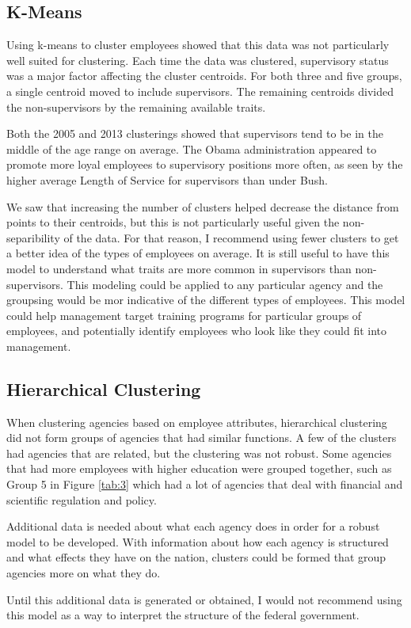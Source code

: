 \documentclass{article}
\begin{document}
    \subsection{K-Means}
    Using k-means to cluster employees showed that this data was not particularly well suited for clustering. Each time the data was clustered, supervisory status was a major factor affecting the cluster centroids. For both three and five groups, a single centroid moved to include supervisors. The remaining centroids divided the non-supervisors by the remaining available traits.
    \par
    Both the 2005 and 2013 clusterings showed that supervisors tend to be in the middle of the age range on average. The Obama administration appeared to promote more loyal employees to supervisory positions more often, as seen by the higher average Length of Service for supervisors than under Bush.
    \par
    We saw that increasing the number of clusters helped decrease the distance from points to their centroids, but this is not particularly useful given the non-separibility of the data. For that reason, I recommend using fewer clusters to get a better idea of the types of employees on average. It is still useful to have this model to understand what traits are more common in supervisors than non-supervisors. This modeling could be applied to any particular agency and the groupsing would be mor indicative of the different types of employees. This model could help management target training programs for particular groups of employees, and potentially identify employees who look like they could fit into management.

    \subsection{Hierarchical Clustering}
    When clustering agencies based on employee attributes, hierarchical clustering did not form groups of agencies that had similar functions. A few of the clusters had agencies that are related, but the clustering was not robust. Some agencies that had more employees with higher education were grouped together, such as Group 5 in Figure \ref{tab:3} which had a lot of agencies that deal with financial and scientific regulation and policy.
    \par
    Additional data is needed about what each agency does in order for a robust model to be developed. With information about how each agency is structured and what effects they have on the nation, clusters could be formed that group agencies more on what they do.
    \par
    Until this additional data is generated or obtained, I would not recommend using this model as a way to interpret the structure of the federal government.
\end{document}
